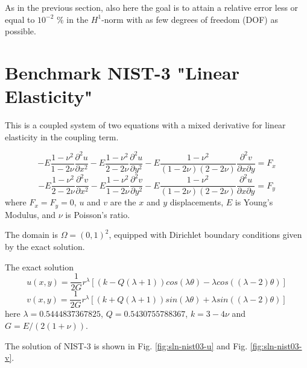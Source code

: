 \documentclass[12pt]{elsarticle}
\begin{document}
As in the previous section, also here the goal is to attain a relative
error less or equal to $10^{-2}$ \% in the $H^1$-norm with as few degrees
of freedom (DOF) as possible.

\section{Benchmark NIST-3 "Linear Elasticity"}
\label{sec:bench-3}

This is a coupled system of two equations with a mixed
derivative for linear elasticity in the coupling term.

\begin{equation} \label{crack-u}
-E \frac{1-\nu^2}{1-2\nu} \frac{\partial^{2} u}{\partial x^{2}} - E\frac{1-\nu^2}{2-2 \nu} \frac{\partial^{2} u}{\partial y^{2}}
-E \frac{1-\nu^2}{(1-2\nu)(2-2\nu)} \frac{\partial^{2} v}{\partial x \partial y} = F_{x}
\end{equation}
\begin{equation} \label{crack-v}
-E \frac{1-\nu^2}{2-2\nu} \frac{\partial^{2} v}{\partial x^{2}} - E\frac{1-\nu^2}{1-2\nu} \frac{\partial^{2} v}{\partial y^{2}}
-E \frac{1-\nu^2}{(1-2\nu)(2-2\nu)} \frac{\partial^{2} u}{\partial x \partial y} = F_{y}
\end{equation}
where $F_{x} = F_{y} = 0$, $u$ and $v$ are the
$x$ and $y$ displacements, $E$ is Young's Modulus,
and $\nu$ is Poisson's ratio.

The domain is $\Omega = (0, 1)^2$, equipped with Dirichlet
boundary conditions given by the exact solution.

The exact solution
\begin{equation}\label{exact-nist-3-u-1}
u(x, y) = \frac{1}{2G} r^{\lambda}[(k - Q(\lambda + 1))cos(\lambda \theta) - \lambda cos((\lambda - 2) \theta)]
\end{equation}
\begin{equation}\label{exact-nist-3-v-1}
v(x, y) = \frac{1}{2G} r^{\lambda}[(k + Q(\lambda + 1))sin(\lambda \theta) + \lambda sin((\lambda - 2) \theta)]
\end{equation}
here $\lambda = 0.5444837367825$, $Q = 0.5430755788367$,
$k = 3 - 4 \nu$ and $G = E / (2(1 + \nu))$.

The solution of NIST-3 is shown in Fig. \ref{fig:sln-nist03-u} and Fig. \ref{fig:sln-nist03-v}.
\end{document}
